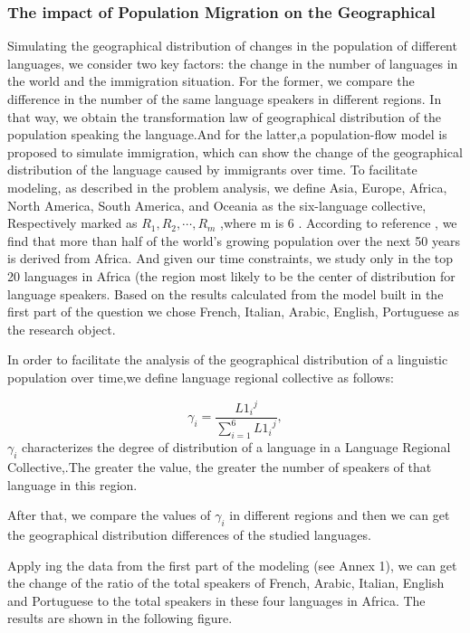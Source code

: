 \subsubsection{The impact of Population Migration on the Geographical}
\noindent
Simulating the geographical distribution of changes in the population of different languages, we consider two key factors: the change in the number of languages in the world and the immigration situation. For the former, we compare the difference in the number of the same language speakers in different regions. In that way, we obtain the transformation law of geographical distribution of the population speaking the language.And for the latter,a population-flow model is proposed to simulate immigration, which can show the change of the geographical distribution of the language caused by immigrants over time. To facilitate modeling, as described in the problem analysis, we define Asia, Europe, Africa, North America, South America, and Oceania as the six-language collective, Respectively marked as ${R_1},{R_2}, \cdots ,{R_m}$ ,where m is 6 . According to reference , we find that more than half of the world's growing population over the next 50 years is derived from Africa. And given our time constraints, we study only in the top 20 languages in Africa (the region most likely to be the center of distribution for language speakers. Based on the results calculated from the model built in the first part of the question we chose French, Italian, Arabic, English, Portuguese as the research object.

In order to facilitate the analysis of the geographical distribution of a linguistic population over time,we define language regional collective as follows:

\begin{equation}
{\gamma _i} = \frac{{L{1_i}^j}}{{\sum\limits_{i = 1}^6 {L{1_i}^j} }},
\end{equation}
\noindent
${\gamma _i}$ characterizes the degree of distribution of a language in a Language Regional Collective,.The greater the value, the greater the number of speakers of that language in this region.

After that, we compare the values of ${\gamma _i}$ in different regions and then we can get the geographical distribution differences of the studied languages.

Apply ing the data from the first part of the modeling (see Annex 1), we can get the change of the ratio of the total speakers of French, Arabic, Italian, English and Portuguese to the total speakers in these four languages in Africa. The results are shown in the following figure.


